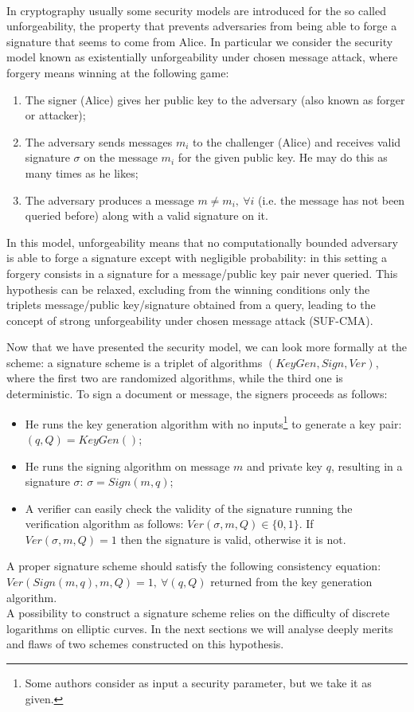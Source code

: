 \\
In cryptography usually some security models are introduced for the so called unforgeability, the property that prevents adversaries from being able to forge a signature that seems to come from Alice. In particular we consider the security model known as existentially unforgeability under chosen message attack, where forgery means winning at the following game:
\begin{enumerate}
	\item The signer (Alice) gives her public key to the adversary (also known as forger or attacker);
	\item The adversary sends messages $m_i$ to the challenger (Alice) and receives valid signature $\sigma$ on the message $m_i$ for the given public key. He may do this as many times as he likes;
	\item The adversary produces a message $m \neq m_i, \ \forall i$ (i.e. the message has not been queried before) along with a valid signature on it.
\end{enumerate}
In this model, unforgeability means that no computationally bounded adversary is able to forge a signature except with negligible probability: in this setting a forgery consists in a signature for a message/public key pair never queried. This hypothesis can be relaxed, excluding from the winning conditions only the triplets message/public key/signature obtained from a query, leading to the concept of strong unforgeability under chosen message attack (SUF-CMA).

\bigskip
\noindent
Now that we have presented the security model, we can look more formally at the scheme: a signature scheme is a triplet of algorithms $(KeyGen, Sign, Ver)$, where the first two are randomized algorithms, while the third one is deterministic. To sign a document or message, the signers proceeds as follows:
\begin{itemize}
	\item He runs the key generation algorithm with no inputs\footnote{Some authors consider as input a security parameter, but we take it as given.} to generate a key pair: $(q, Q) = KeyGen()$;
	\item He runs the signing algorithm on message $m$ and private key $q$, resulting in a signature $\sigma$: $\sigma = Sign(m, q)$;
	\item A verifier can easily check the validity of the signature running the verification algorithm as follows: $Ver(\sigma, m, Q) \in \{0, 1\}$. If $Ver(\sigma, m, Q) = 1$ then the signature is valid, otherwise it is not.
\end{itemize}
A proper signature scheme should satisfy the following consistency equation: $Ver(Sign(m,q), m, Q) = 1, \ \forall (q, Q)$ returned from the key generation algorithm.
\\
A possibility to construct a signature scheme relies on the difficulty of discrete logarithms on elliptic curves. In the next sections we will analyse deeply merits and flaws of two schemes constructed on this hypothesis.

